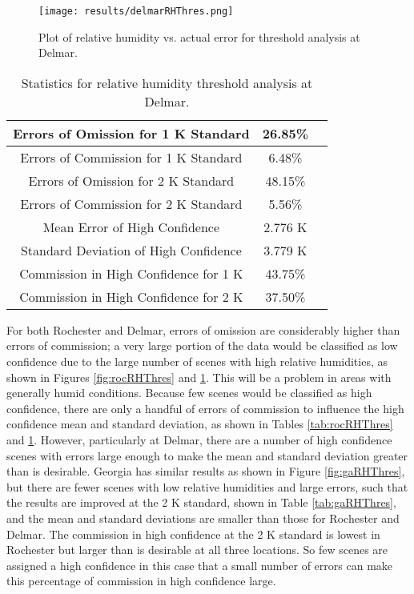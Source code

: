 \documentclass{book}
\begin{document}
\begin{minipage}[c]{0.47\textwidth}
\centering
\begin{figure}[H]
\texttt{[image: results/delmarRHThres.png]}
\caption{Plot of relative humidity vs. actual error for threshold analysis at Delmar.}
\label{fig:delmarRHThres}
\end{figure}
\end{minipage}
\begin{minipage}[c]{0.47\textwidth}
\begin{table}[H]
\centering
\footnotesize
\begin{tabular}{ | c | c | c | } \hline
Errors of Omission for 1 K Standard & 26.85\% \\ \hline
Errors of Commission for 1 K Standard & 6.48\% \\ \hline
Errors of Omission for 2 K Standard & 48.15\% \\ \hline
Errors of Commission for 2 K Standard & 5.56\% \\ \hline
Mean Error of High Confidence & 2.776 K \\ \hline
Standard Deviation of High Confidence & 3.779 K \\ \hline
Commission in High Confidence for 1 K & 43.75\% \\ \hline
Commission in High Confidence for 2 K & 37.50\% \\ \hline
\end{tabular}
\caption{Statistics for relative humidity threshold analysis at Delmar.}
\label{tab:delmarRHThres}
\end{table}
\end{minipage}

For both Rochester and Delmar, errors of omission are considerably higher than errors of commission; a very large portion of the data would be classified as low confidence due to the large number of scenes with high relative humidities, as shown in Figures \ref{fig:rocRHThres} and \ref{fig:delmarRHThres}.  This will be a problem in areas with generally humid conditions.  Because few scenes would be classified as high confidence, there are only a handful of errors of commission to influence the high confidence mean and standard deviation, as shown in Tables \ref{tab:rocRHThres} and \ref{tab:delmarRHThres}.  However, particularly at Delmar, there are a number of high confidence scenes with errors large enough to make the mean and standard deviation greater than is desirable.  Georgia has similar results as shown in Figure \ref{fig:gaRHThres}, but there are fewer scenes with low relative humidities and large errors, such that the results are improved at the 2 K standard, shown in Table \ref{tab:gaRHThres}, and the mean and standard deviations are smaller than those for Rochester and Delmar.  The commission in high confidence at the 2 K standard is lowest in Rochester but larger than is desirable at all three locations.  So few scenes are assigned a high confidence in this case that a small number of errors can make this percentage of commission in high confidence large.
\end{document}
